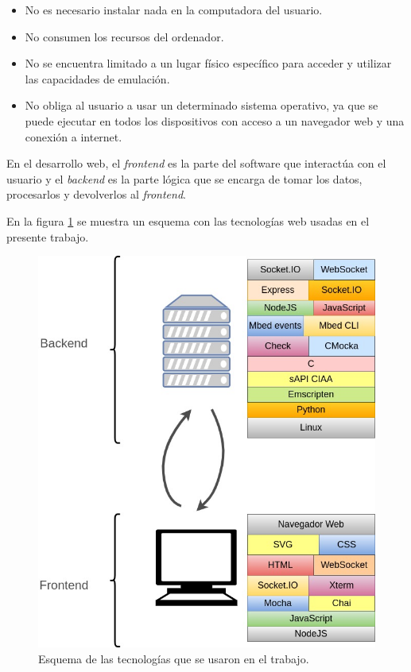 \begin{itemize}
	\item No es necesario instalar nada en la computadora del usuario.
	\item No consumen los recursos del ordenador.
	\item No se encuentra limitado a un lugar físico específico para acceder y utilizar las capacidades de emulación.
	\item No obliga al usuario a usar un determinado sistema operativo, ya que se puede ejecutar en todos los dispositivos con acceso a un navegador web y una conexión a internet.
\end{itemize}

En el desarrollo web, el \textit{frontend} es la parte del software que interactúa con el usuario y el \textit{backend} es la parte lógica que se encarga de tomar los datos, procesarlos y devolverlos al \textit{frontend}.

En la figura \ref{fig:frontBack} se muestra un esquema con las tecnologías
web usadas en el presente trabajo.

\begin{figure}[ht]
	\centering
	\includegraphics[scale=.57]{./Figures/FrontendBackend.jpg}
	\caption{Esquema de las tecnologías que se usaron en el trabajo.}
	\label{fig:frontBack}
\end{figure}

